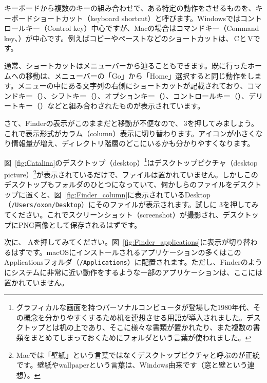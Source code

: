 キーボードから複数のキーの組み合わせで、ある特定の動作をさせるものを、キーボードショートカット（keyboard shortcut）と呼びます。Windowsではコントロールキー（Control key）中心ですが、Macの場合はコマンドキー（Command key、\cmdkey）が中心です。例えばコピーやペーストなどのショートカットは、\cmdkey\,Cと\cmdkey\,Vです。

通常、ショートカットはメニューバーから辿ることもできます。既に行ったホームへの移動は、メニューバーの「Go」から「Home」選択すると同じ動作をします。メニューの中にある文字列の右側にショートカットが記載されており、コマンドキー（\cmdkey）、シフトキー（\shiftkey）、オプションキー（\optkey）、コントロールキー（\ctlkey）、デリートキー（\delkey）などと組み合わされたものが表示されています。

さて、Finderの表示がこのままだと移動が不便なので、\cmdkey\,3を押してみましょう。これで表示形式がカラム（column）表示に切り替わります。アイコンが小さくなり情報量が増え、ディレクトリ階層のどこにいるかも分かりやすくなります。

図~\ref{fig:Catalina}のデスクトップ（desktop）\footnote{グラフィカルな画面を持つパーソナルコンピュータが登場した1980年代、その概念を分かりやすくするため机を連想させる用語が導入されました。デスクトップとは机の上であり、そこに様々な書類が置かれたり、また複数の書類をまとめてしまっておくためにフォルダという言葉が使われました。}はデスクトップピクチャ（desktop picture）\footnote{Macでは「壁紙」という言葉ではなくデスクトップピクチャと呼ぶのが正統です。壁紙やwallpaperという言葉は、Windows由来です（窓と壁という連想）。}が表示されているだけで、ファイルは置かれていません。しかしこのデスクトップもフォルダのひとつになっていて、何かしらのファイルをデスクトップに置くと、図~\ref{fig:Finder_column}に表示されているDesktop（\texttt{/Users/oxon/Desktop}）にそのファイルが表示されます。試しに\cmdkey\,\shiftkey\,3を押してみてください。これでスクリーンショット（screenshot）が撮影され、デスクトップにPNG画像として保存されるはずです。

次に、\cmdkey\,\shiftkey\,Aを押してみてください。図~\ref{fig:Finder_applications}に表示が切り替わるはずです。macOSにインストールされるアプリケーションの多くはこのApplicationsフォルダ（\texttt{/Applications}）に配置されます。ただし、Finderのようにシステムに非常に近い動作をするような一部のアプリケーションは、ここには置かれていません。

